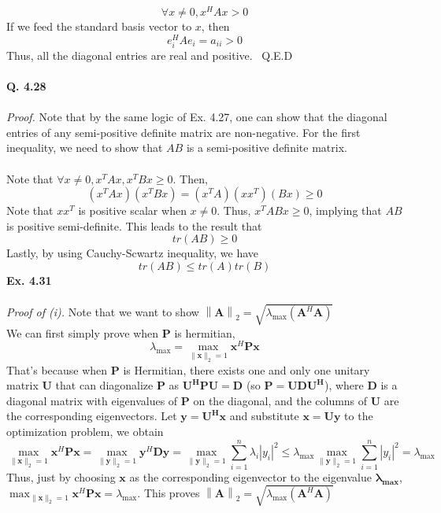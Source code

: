 \documentclass[letterpaper,12pt]{article}
\theoremstyle{definition}
\begin{document}
\[ \forall x \neq 0, x^H A x > 0\]
If we feed the standard basis vector to $x$, then \\
\[e_{i}^{H} A e_{i} = a_{ii} > 0 \]
Thus, all the diagonal entries are real and positive. \ Q.E.D \\\\
\textbf{Q. 4.28}\\\\
\emph{Proof.} Note that by the same logic of Ex. 4.27, one can show that the diagonal entries of any semi-positive definite matrix are non-negative. For the first inequality, we need to show that $AB$ is a semi-positive definite matrix.\\\\
Note that $\forall x \neq 0, x^T A x, x^T B x  \geq 0 $. Then,
\[(x^T A x) (x^T B x) = (x^T A)(x x^T) (Bx) \geq 0\]
Note that $x x^T$ is positive scalar when $x \neq 0$. Thus, $x^T AB x \geq 0$, implying that $AB$ is positive semi-definite. This leads to the result that
\[ tr(AB) \geq 0 \]
Lastly, by using Cauchy-Scwartz inequality, we have
\[tr(AB) \leq tr(A) tr(B) \]
\newline
\textbf{Ex. 4.31}\\\\
\emph{Proof of (i).} Note that we want to show $\left\| \mathbf{A}\right\|_2 = \sqrt{\lambda_{\max}(\mathbf{A}^H \mathbf{A})}$ \\
We can first simply prove when $\mathbf{P}$ is hermitian, \\
\[\lambda_{\max} = \max_{\| \mathbf{x} \|_2=1} \mathbf{x}^H \mathbf{Px}\]
That's because when $\mathbf{P}$ is Hermitian, there exists one and only one unitary matrix $\mathbf{U}$ that can diagonalize $\mathbf{P}$ as $\mathbf{U^HPU=D}$ (so $\mathbf{P=UDU^H}$), where $\mathbf{D}$ is a diagonal matrix with eigenvalues of $\mathbf{P}$ on the diagonal, and the columns of $\mathbf{U}$ are the corresponding eigenvectors. Let $\mathbf{y=U^H x}$ and substitute $\mathbf{x=Uy}$ to the optimization problem, we obtain
\[ \max_{\| \mathbf{x} \|_2=1} \mathbf{x}^H \mathbf{Px} = \max_{\| \mathbf{y} \|_2=1} \mathbf{y}^H \mathbf{Dy} = \max_{\| \mathbf{y} \|_2=1} \sum_{i=1}^n \lambda_i |y_i|^2 \le \lambda_{\max} \max_{\| \mathbf{y} \|_2=1} \sum_{i=1}^n |y_i|^2 = \lambda_{\max}\]
Thus, just by choosing $\mathbf{x}$ as the corresponding eigenvector to the eigenvalue $\mathbf{\lambda_{max}}$, \\
$\max_{\| \mathbf{x} \|_2=1} \mathbf{x}^H \mathbf{Px} = \lambda_{\max}$. This proves $\left\| \mathbf{A}\right\|_2 = \sqrt{\lambda_{\max}(\mathbf{A}^H \mathbf{A})}$ \\\\
\end{document}
